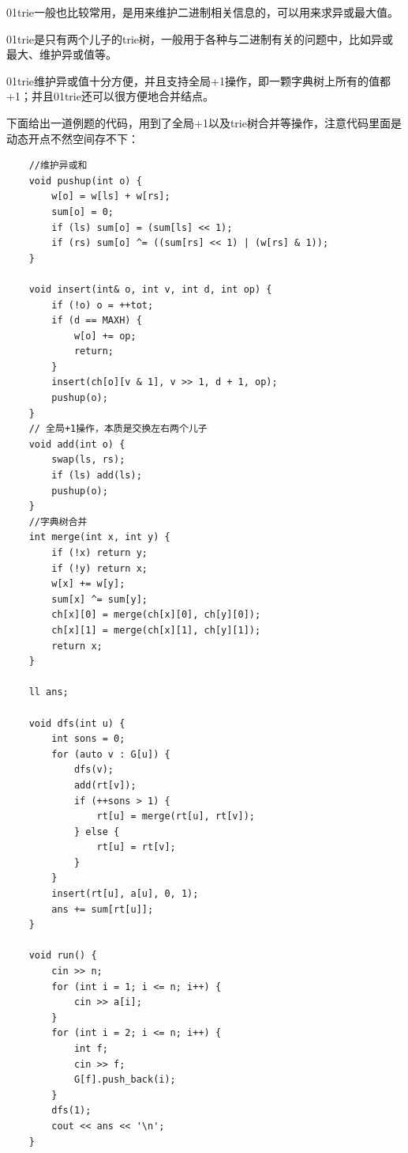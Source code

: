 \documentclass[a4paper,11pt,twoside,fontset = fandol,UTF8]{ctexbook} %
\begin{document}
	01trie一般也比较常用，是用来维护二进制相关信息的，可以用来求异或最大值。
	
	01trie是只有两个儿子的trie树，一般用于各种与二进制有关的问题中，比如异或最大、维护异或值等。
	
	01trie维护异或值十分方便，并且支持全局+1操作，即一颗字典树上所有的值都+1；并且01trie还可以很方便地合并结点。
	
	下面给出一道例题的代码，用到了全局+1以及trie树合并等操作，注意代码里面是动态开点不然空间存不下：
	
	\begin{lstlisting}
	//维护异或和
	void pushup(int o) {
	    w[o] = w[ls] + w[rs];
	    sum[o] = 0;
	    if (ls) sum[o] = (sum[ls] << 1);
	    if (rs) sum[o] ^= ((sum[rs] << 1) | (w[rs] & 1));
	}
	
	void insert(int& o, int v, int d, int op) {
	    if (!o) o = ++tot;
	    if (d == MAXH) {
	        w[o] += op;
	        return;
	    }
	    insert(ch[o][v & 1], v >> 1, d + 1, op);
	    pushup(o);
	}
	// 全局+1操作，本质是交换左右两个儿子
	void add(int o) {
	    swap(ls, rs);
	    if (ls) add(ls);
	    pushup(o);
	}
	//字典树合并
	int merge(int x, int y) {
	    if (!x) return y;
	    if (!y) return x;
	    w[x] += w[y];
	    sum[x] ^= sum[y];
	    ch[x][0] = merge(ch[x][0], ch[y][0]);
	    ch[x][1] = merge(ch[x][1], ch[y][1]);
	    return x;
	}
	
	ll ans;
	
	void dfs(int u) {
	    int sons = 0;
	    for (auto v : G[u]) {
	        dfs(v);
	        add(rt[v]);
	        if (++sons > 1) {
	            rt[u] = merge(rt[u], rt[v]);
	        } else {
	            rt[u] = rt[v];
	        }
	    }
	    insert(rt[u], a[u], 0, 1);
	    ans += sum[rt[u]];
	}
	
	void run() {
	    cin >> n;
	    for (int i = 1; i <= n; i++) {
	        cin >> a[i];
	    }
	    for (int i = 2; i <= n; i++) {
	        int f; 
	        cin >> f;
	        G[f].push_back(i);
	    }
	    dfs(1);
	    cout << ans << '\n';
	}
	\end{lstlisting}
	
\end{document}
